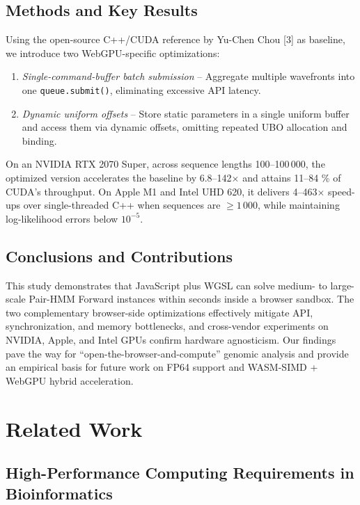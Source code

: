 \documentclass[PhD]{PHlab-thesis}
\begin{document}
\section{Methods and Key Results}
Using the open-source C++/CUDA reference by Yu-Chen Chou [3] as baseline, we introduce two WebGPU-specific optimizations:

\begin{enumerate}
  \item \textit{Single-command-buffer batch submission} – Aggregate multiple wavefronts into one \verb|queue.submit()|, eliminating excessive API latency.
  \item \textit{Dynamic uniform offsets} – Store static parameters in a single uniform buffer and access them via dynamic offsets, omitting repeated UBO allocation and binding.
\end{enumerate}

On an NVIDIA RTX 2070 Super, across sequence lengths 100–100\,000, the optimized version accelerates the baseline by 6.8–142$\times$ and attains 11–84 \% of CUDA's throughput. On Apple M1 and Intel UHD 620, it delivers 4–463$\times$ speed-ups over single-threaded C++ when sequences are $\ge 1\,000$, while maintaining log-likelihood errors below $10^{-5}$.

\section{Conclusions and Contributions}
This study demonstrates that JavaScript plus WGSL can solve medium- to large-scale Pair-HMM Forward instances within seconds inside a browser sandbox. The two complementary browser-side optimizations effectively mitigate API, synchronization, and memory bottlenecks, and cross-vendor experiments on NVIDIA, Apple, and Intel GPUs confirm hardware agnosticism.  
Our findings pave the way for “open-the-browser-and-compute” genomic analysis and provide an empirical basis for future work on FP64 support and WASM-SIMD + WebGPU hybrid acceleration.




\chapter{Related Work}

\section{High-Performance Computing Requirements in Bioinformatics}
\end{document}
